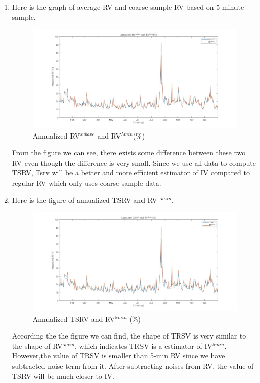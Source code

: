 \documentclass[12pt,letterpaper]{article}
\begin{document}
\begin{enumerate}[label=\textbf{(\Alph*)}]
\item
Here is the graph of average RV and coarse sample RV based on 5-minute sample.
\begin{figure}[H]
	\centering
	\includegraphics[width=12cm]{figures/ex7_F.jpg}
	\caption{Annualized RV$^{subave}$ and RV$^{5min}$(\%)}
\end{figure}
From the figure we can see, there exists some difference between these two RV even though the difference is very small. Since we use all data to compute TSRV, Tsrv will be a better and more efficient estimator of IV compared to regular RV which only uses coarse sample data.

\item
Here is the figure of annualized TSRV and RV $^{5min}$.
\begin{figure}[H]
	\centering
	\includegraphics[width=12cm]{figures/ex7_G.jpg}
	\caption{Annualized TSRV and RV$^{5min}$ (\%)}
\end{figure}
According the the figure we can find, the shape of TRSV is very similar to the shape of RV$^{5min}$, which indicates TRSV is a estimator of IV$^{5min}$. However,the value of TRSV is smaller than 5-min RV since we have subtracted noise term from it. After subtracting noises from RV, the value of TSRV will be much closer to IV.


\end{enumerate}
\end{document}
